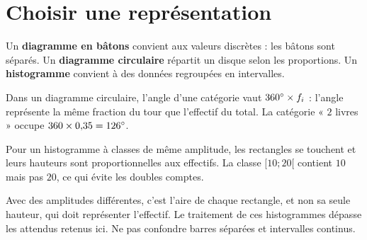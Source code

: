 \documentclass[../cours_3e.tex]{subfiles}
\begin{document}
\section{Choisir une représentation}
Un \textbf{diagramme en bâtons} convient aux valeurs discrètes : les bâtons sont séparés. Un \textbf{diagramme circulaire} répartit un disque selon les proportions. Un \textbf{histogramme} convient à des données regroupées en intervalles.
\begin{center}
\end{center}
Dans un diagramme circulaire, l'angle d'une catégorie vaut $360^{\circ}\times f_i$ : l'angle représente la même fraction du tour que l'effectif du total. La catégorie « $2$ livres » occupe $360\times0{,}35=126^{\circ}$.

Pour un histogramme à classes de même amplitude, les rectangles se touchent et leurs hauteurs sont proportionnelles aux effectifs. La classe $[10;20[$ contient $10$ mais pas $20$, ce qui évite les doubles comptes.
\begin{center}
\end{center}
\begin{attention}
Avec des amplitudes différentes, c'est l'aire de chaque rectangle, et non sa seule hauteur, qui doit représenter l'effectif. Le traitement de ces histogrammes dépasse les attendus retenus ici. Ne pas confondre barres séparées et intervalles continus.
\end{attention}
\end{document}
